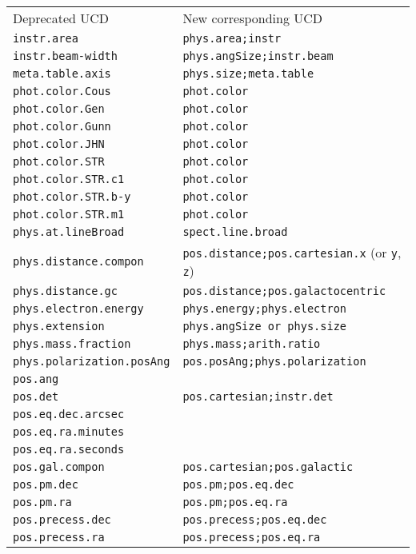 \documentclass[11pt,a4paper]{ivoa}
\begin{document}
\begin{enumerate}
\begin{tabular}{|l|l|}
\sptablerule
Deprecated UCD & New corresponding UCD\\
\sptablerule
{\tt instr.area} & {\tt phys.area;instr}\\
{\tt instr.beam-width} & {\tt phys.angSize;instr.beam}\\
{\tt meta.table.axis} & {\tt phys.size;meta.table}\\
{\tt phot.color.Cous} & {\tt phot.color}\\
{\tt phot.color.Gen} & {\tt phot.color}\\
{\tt phot.color.Gunn} & {\tt phot.color}\\
{\tt phot.color.JHN} & {\tt phot.color}\\
{\tt phot.color.STR} & {\tt phot.color}\\
{\tt phot.color.STR.c1} & {\tt phot.color}\\ 
{\tt phot.color.STR.b-y} & {\tt phot.color}\\
{\tt phot.color.STR.m1} & {\tt phot.color}\\
{\tt phys.at.lineBroad} & {\tt spect.line.broad}\\ 
{\tt phys.distance.compon} & {\tt pos.distance;pos.cartesian.x} (or {\tt y}, {\tt z})\\
{\tt phys.distance.gc} & {\tt pos.distance;pos.galactocentric}\\
{\tt phys.electron.energy} & {\tt phys.energy;phys.electron}\\
{\tt phys.extension} & {\tt phys.angSize or phys.size}\\
{\tt phys.mass.fraction} & {\tt phys.mass;arith.ratio}\\
{\tt phys.polarization.posAng} & {\tt pos.posAng;phys.polarization}\\
{\tt pos.ang} & \\
{\tt pos.det} & {\tt pos.cartesian;instr.det}\\
{\tt pos.eq.dec.arcsec} & \\
{\tt pos.eq.ra.minutes} & \\
{\tt pos.eq.ra.seconds} & \\
{\tt pos.gal.compon} & {\tt pos.cartesian;pos.galactic}\\
{\tt pos.pm.dec} & {\tt pos.pm;pos.eq.dec}\\
{\tt pos.pm.ra} & {\tt pos.pm;pos.eq.ra}\\
{\tt pos.precess.dec} & {\tt pos.precess;pos.eq.dec}\\
{\tt pos.precess.ra} & {\tt pos.precess;pos.eq.ra}\\

\end{tabular}
\end{enumerate}
\end{document}
